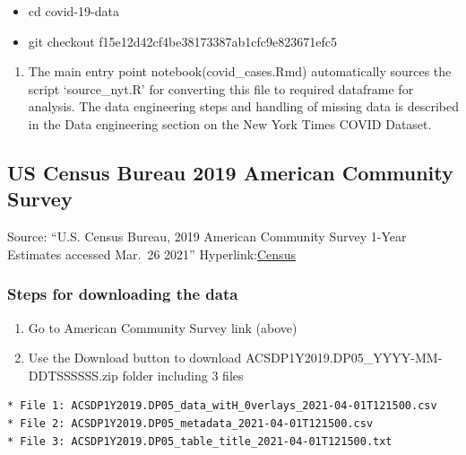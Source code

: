 \documentclass[
]{article}
\providecommand{\tightlist}{%
  \setlength{\itemsep}{0pt}\setlength{\parskip}{0pt}}
\begin{document}
\begin{itemize}
\tightlist
\item
  cd covid-19-data
\item
  git checkout f15e12d42cf4be38173387ab1cfc9e823671efc5
\end{itemize}

\begin{enumerate}
\def\labelenumi{\arabic{enumi}.}
\setcounter{enumi}{3}
\tightlist
\item
  The main entry point notebook(covid\_cases.Rmd) automatically sources
  the script `source\_nyt.R' for converting this file to required
  dataframe for analysis. The data engineering steps and handling of
  missing data is described in the Data engineering section on the New
  York Times COVID Dataset.
\end{enumerate}

\hypertarget{us-census-bureau-2019-american-community-survey}{%
\subsection{US Census Bureau 2019 American Community
Survey}\label{us-census-bureau-2019-american-community-survey}}

Source: ``U.S. Census Bureau, 2019 American Community Survey 1-Year
Estimates accessed Mar.~26 2021''
Hyperlink:\href{https://data.census.gov/cedsci/table?q=ACS\&g=0100000US.04000.001\&tid=ACSDP1Y2019.DP05\&moe=false\&hidePreview=true}{Census}

\hypertarget{steps-for-downloading-the-data-1}{%
\subsubsection{Steps for downloading the
data}\label{steps-for-downloading-the-data-1}}

\begin{enumerate}
\def\labelenumi{\arabic{enumi}.}
\tightlist
\item
  Go to American Community Survey link (above)
\item
  Use the Download button to download
  ACSDP1Y2019.DP05\_YYYY-MM-DDTSSSSSS.zip folder including 3 files
\end{enumerate}

\begin{verbatim}
* File 1: ACSDP1Y2019.DP05_data_witH_0verlays_2021-04-01T121500.csv
* File 2: ACSDP1Y2019.DP05_metadata_2021-04-01T121500.csv
* File 3: ACSDP1Y2019.DP05_table_title_2021-04-01T121500.txt
\end{verbatim}
\end{document}
